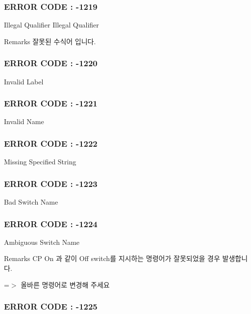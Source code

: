  \subsubsection*{E\-R\-R\-O\-R C\-O\-D\-E \-: -\/1219 }

Illegal Qualifier  Illegal Qualifier \begin{DoxyRemark}{Remarks}
잘못된 수식어 입니다.
\end{DoxyRemark}


 \subsubsection*{E\-R\-R\-O\-R C\-O\-D\-E \-: -\/1220 }

Invalid Label



 \subsubsection*{E\-R\-R\-O\-R C\-O\-D\-E \-: -\/1221 }

Invalid Name



 \subsubsection*{E\-R\-R\-O\-R C\-O\-D\-E \-: -\/1222 }

Missing Specified String



 \subsubsection*{E\-R\-R\-O\-R C\-O\-D\-E \-: -\/1223 }

Bad Switch Name



 \subsubsection*{E\-R\-R\-O\-R C\-O\-D\-E \-: -\/1224 }

Ambiguous Switch Name \begin{DoxyRemark}{Remarks}
C\-P On 과 같이 Off switch를 지시하는 명령어가 잘못되었을 경우 발생합니다. \par
 =$>$ 올바른 명령어로 변경해 주세요
\end{DoxyRemark}


 \subsubsection*{E\-R\-R\-O\-R C\-O\-D\-E \-: -\/1225 }

